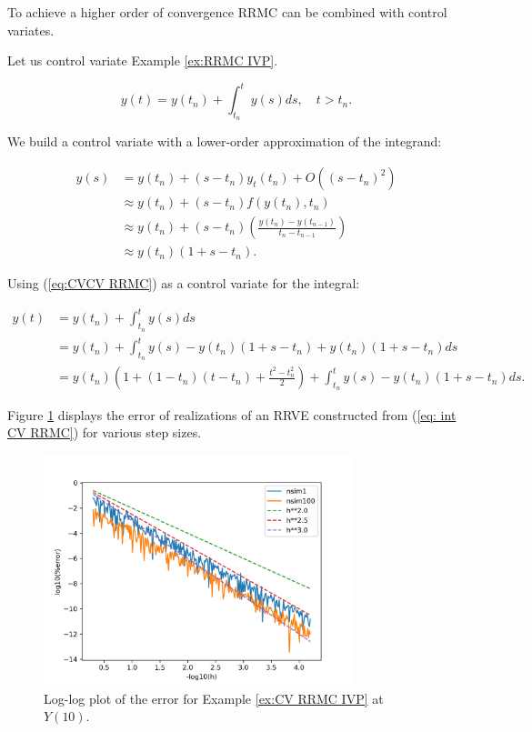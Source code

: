 \documentclass[a4paper,12pt]{article}
\begin{document}
To achieve a higher order of convergence RRMC can be combined with control variates.
\begin{example}[CV RRMC $y_t=y$]\label{ex:CV RRMC IVP}
  Let us control variate Example \ref{ex:RRMC IVP}.

  \begin{equation}
    y(t)= y(t_{n}) + \int_{t_{n}}^{t}y(s)ds , \quad t>t_{n}.
  \end{equation}

  We build a control variate with a lower-order approximation
  of the integrand:

  \begin{align}
    y(s) & = y(t_{n}) + (s-t_{n})y_t(t_{n}) + O((s-t_{n})^{2})      \\
         & \approx y(t_{n}) + (s-t_{n})f(y(t_{n}),t_{n})            \\
         & \approx y(t_{n}) +
    (s-t_{n})\left(\frac{y(t_{n})-y(t_{n-1})}{t_{n}-t_{n-1}}\right) \\
         & \approx y(t_{n})(1+s-t_{n}). \label{eq:CVCV RRMC}
  \end{align}

  Using (\ref{eq:CVCV RRMC}) as a control variate for the integral:

  \begin{align}
    y(t) & = y(t_{n}) + \int_{t_{n}}^{t}y(s)ds                                          \\
         & = y(t_{n}) + \int_{t_{n}}^{t}y(s)-y(t_{n})(1+s-t_{n}) +y(t_{n})(1+s-t_{n})ds \\
         & = y(t_{n})\left(1 + (1-t_{n})(t-t_{n})+\frac{t^{2}-t_{n}^{2}}{2}\right)
    + \int_{t_{n}}^{t}y(s)-y(t_{n})(1+s-t_{n})ds. \label{eq: int CV RRMC}
  \end{align}

  Figure \ref{fig:CV RRMC IVP} displays the error
  of realizations of an RRVE constructed from (\ref{eq: int CV RRMC})
  for various step sizes.

  \begin{figure}[h!]
    \centering
    \includegraphics[width=0.8\textwidth]{plots/CV RRMC IVP.png}
    \caption{Log-log plot of the error for Example
      \ref{ex:CV RRMC IVP} at $Y(10)$.}
    \label{fig:CV RRMC IVP}
  \end{figure}
\end{example}
\end{document}
